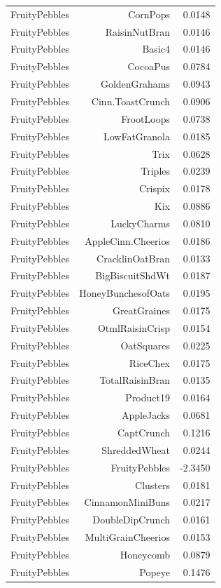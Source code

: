 \begin{longtable}{@{}lrr@{}}
FruityPebbles & CornPops & 0.0148 \\
FruityPebbles & RaisinNutBran & 0.0146 \\
FruityPebbles & Basic4 & 0.0146 \\
FruityPebbles & CocoaPus & 0.0784 \\
FruityPebbles & GoldenGrahams & 0.0943 \\
FruityPebbles & Cinn.ToastCrunch & 0.0906 \\
FruityPebbles & FrootLoops & 0.0738 \\
FruityPebbles & LowFatGranola & 0.0185 \\
FruityPebbles & Trix & 0.0628 \\
FruityPebbles & Triples & 0.0239 \\
FruityPebbles & Crispix & 0.0178 \\
FruityPebbles & Kix & 0.0886 \\
FruityPebbles & LuckyCharms & 0.0810 \\
FruityPebbles & AppleCinn.Cheerios & 0.0186 \\
FruityPebbles & CracklinOatBran & 0.0133 \\
FruityPebbles & BigBiscuitShdWt & 0.0187 \\
FruityPebbles & HoneyBunchesofOats & 0.0195 \\
FruityPebbles & GreatGraines & 0.0175 \\
FruityPebbles & OtmlRaisinCrisp & 0.0154 \\
FruityPebbles & OatSquares & 0.0225 \\
FruityPebbles & RiceChex & 0.0175 \\
FruityPebbles & TotalRaisinBran & 0.0135 \\
FruityPebbles & Product19 & 0.0164 \\
FruityPebbles & AppleJacks & 0.0681 \\
FruityPebbles & CaptCrunch & 0.1216 \\
FruityPebbles & ShreddedWheat & 0.0244 \\
FruityPebbles & FruityPebbles & -2.3450 \\
FruityPebbles & Clusters & 0.0181 \\
FruityPebbles & CinnamonMiniBuns & 0.0217 \\
FruityPebbles & DoubleDipCrunch & 0.0161 \\
FruityPebbles & MultiGrainCheerios & 0.0153 \\
FruityPebbles & Honeycomb & 0.0879 \\
FruityPebbles & Popeye & 0.1476 \\

\end{longtable}
